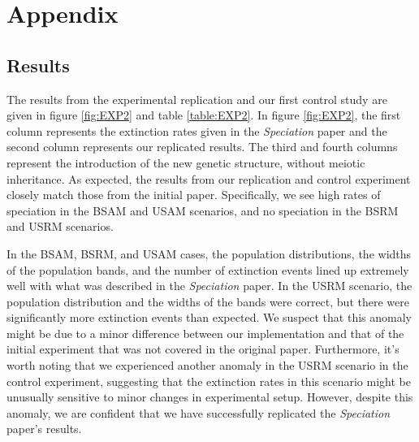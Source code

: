 \documentclass[conference]{IEEEtran}
\begin{document}
\section{Appendix}

\subsection{Results}

The results from the experimental replication and our first control study are given in figure \ref{fig:EXP2} and table \ref{table:EXP2}. In figure \ref{fig:EXP2}, the first column represents the extinction rates given in the \textit{Speciation} paper and the second column represents our replicated results. The third and fourth columns represent the introduction of the new genetic structure, without meiotic inheritance. As expected, the results from our replication and control experiment closely match those from the initial paper. Specifically, we see high rates of speciation in the BSAM and USAM scenarios, and no speciation in the BSRM and USRM scenarios.

In the BSAM, BSRM, and USAM cases, the population distributions, the widths of the population bands, and the number of extinction events lined up extremely well with what was described in the \textit{Speciation} paper. In the USRM scenario, the population distribution and the widths of the bands were correct, but there were significantly more extinction events than expected. We suspect that this anomaly might be due to a minor difference between our implementation and that of the initial experiment that was not covered in the original paper. Furthermore, it’s worth noting that we experienced another anomaly in the USRM scenario in the control experiment, suggesting that the extinction rates in this scenario might be unusually sensitive to minor changes in experimental setup. However, despite this anomaly, we are confident that we have successfully replicated the \textit{Speciation} paper’s results.
\end{document}
